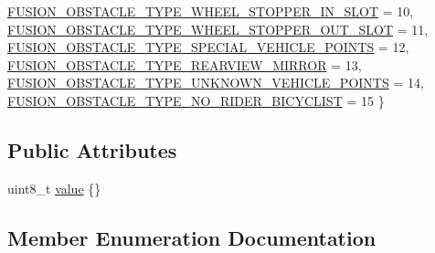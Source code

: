 \begin{DoxyCompactItemize}
\hyperlink{structmaf__perception__interface_1_1FusionObstacleTypeEnum_a4731107a3536c48c441a635ecb6a39ada3193f38377c3aed50637c347258e5b98}{F\+U\+S\+I\+O\+N\+\_\+\+O\+B\+S\+T\+A\+C\+L\+E\+\_\+\+T\+Y\+P\+E\+\_\+\+W\+H\+E\+E\+L\+\_\+\+S\+T\+O\+P\+P\+E\+R\+\_\+\+I\+N\+\_\+\+S\+L\+OT} = 10, 
\hyperlink{structmaf__perception__interface_1_1FusionObstacleTypeEnum_a4731107a3536c48c441a635ecb6a39adaea6ea6ef56bf8bfec1f33e43445be878}{F\+U\+S\+I\+O\+N\+\_\+\+O\+B\+S\+T\+A\+C\+L\+E\+\_\+\+T\+Y\+P\+E\+\_\+\+W\+H\+E\+E\+L\+\_\+\+S\+T\+O\+P\+P\+E\+R\+\_\+\+O\+U\+T\+\_\+\+S\+L\+OT} = 11, 
\newline
\hyperlink{structmaf__perception__interface_1_1FusionObstacleTypeEnum_a4731107a3536c48c441a635ecb6a39adaacb5dfdf4cece0c7db1194498109d871}{F\+U\+S\+I\+O\+N\+\_\+\+O\+B\+S\+T\+A\+C\+L\+E\+\_\+\+T\+Y\+P\+E\+\_\+\+S\+P\+E\+C\+I\+A\+L\+\_\+\+V\+E\+H\+I\+C\+L\+E\+\_\+\+P\+O\+I\+N\+TS} = 12, 
\hyperlink{structmaf__perception__interface_1_1FusionObstacleTypeEnum_a4731107a3536c48c441a635ecb6a39ada8565078306fb5626f369972bd74e851d}{F\+U\+S\+I\+O\+N\+\_\+\+O\+B\+S\+T\+A\+C\+L\+E\+\_\+\+T\+Y\+P\+E\+\_\+\+R\+E\+A\+R\+V\+I\+E\+W\+\_\+\+M\+I\+R\+R\+OR} = 13, 
\hyperlink{structmaf__perception__interface_1_1FusionObstacleTypeEnum_a4731107a3536c48c441a635ecb6a39adaa9a75a94daba2bbf31c5012767023395}{F\+U\+S\+I\+O\+N\+\_\+\+O\+B\+S\+T\+A\+C\+L\+E\+\_\+\+T\+Y\+P\+E\+\_\+\+U\+N\+K\+N\+O\+W\+N\+\_\+\+V\+E\+H\+I\+C\+L\+E\+\_\+\+P\+O\+I\+N\+TS} = 14, 
\hyperlink{structmaf__perception__interface_1_1FusionObstacleTypeEnum_a4731107a3536c48c441a635ecb6a39adae1a5e08e503cdb8d813224b4347dffa8}{F\+U\+S\+I\+O\+N\+\_\+\+O\+B\+S\+T\+A\+C\+L\+E\+\_\+\+T\+Y\+P\+E\+\_\+\+N\+O\+\_\+\+R\+I\+D\+E\+R\+\_\+\+B\+I\+C\+Y\+C\+L\+I\+ST} = 15
 \}
\end{DoxyCompactItemize}
\subsection*{Public Attributes}
\begin{DoxyCompactItemize}
\item 
uint8\+\_\+t \hyperlink{structmaf__perception__interface_1_1FusionObstacleTypeEnum_a205d02a42381dac58dd71e72f80ea8e0}{value} \{\}
\end{DoxyCompactItemize}


\subsection{Member Enumeration Documentation}
\mbox{\label{structmaf__perception__interface_1_1FusionObstacleTypeEnum_a4731107a3536c48c441a635ecb6a39ad}} 
